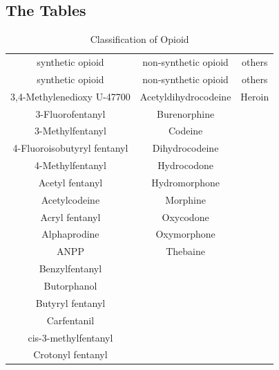 \documentclass[12pt]{mcmthesis}
\begin{document}
\begin{appendices}
\section{The Tables}
\begin{longtable}{|c|c|c|}
    \caption{Classification of Opioid}
    \label{table:opioid}  \\
    \hline
    &&\\

    \endfirsthead

    \hline
    synthetic  opioid&non-synthetic opioid&others\\
  \hline
    \endhead

    \hline
    \endfoot
synthetic  opioid             & non-synthetic opioid & others \\\hline
3,4-Methylenedioxy U-47700    & Acetyldihydrocodeine & Heroin \\
3-Fluorofentanyl              & Burenorphine         &        \\
3-Methylfentanyl              & Codeine              &        \\
4-Fluoroisobutyryl fentanyl   & Dihydrocodeine       &        \\
4-Methylfentanyl              & Hydrocodone          &        \\
Acetyl fentanyl               & Hydromorphone        &        \\
Acetylcodeine                 & Morphine             &        \\
Acryl fentanyl                & Oxycodone            &        \\
Alphaprodine                  & Oxymorphone          &        \\
ANPP                          & Thebaine             &        \\
Benzylfentanyl                &                      &        \\
Butorphanol                   &                      &        \\
Butyryl fentanyl              &                      &        \\
Carfentanil                   &                      &        \\
cis-3-methylfentanyl          &                      &        \\
Crotonyl fentanyl             &                      &        \\

\end{longtable}
\end{appendices}
\end{document}
